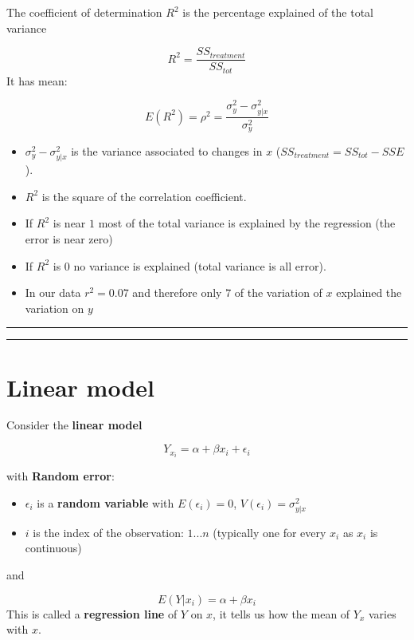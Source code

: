 \documentclass[
]{book}
\begin{document}
The coefficient of determination \(R^2\) is the percentage explained of the total variance

\[R^2=\frac{SS_{treatment}}{SS_{tot}}\]
It has mean:

\[E(R^2)=\rho^2=\frac{\sigma^2_{y}-\sigma^2_{y|x}}{\sigma^2_{y}}\]

\begin{itemize}
\item
  \(\sigma_y^2-\sigma^2_{y|x}\) is the variance associated to changes in \(x\) (\(SS_{treatment}=SS_{tot} - SSE\)).
\item
  \(R^2\) is the square of the correlation coefficient.
\item
  If \(R^2\) is near \(1\) most of the total variance is explained by the regression (the error is near zero)
\item
  If \(R^2\) is \(0\) no variance is explained (total variance is all error).
\item
  In our data \(r^2=0.07\) and therefore only \(7%
  \) of the variation of \(x\) explained the variation on \(y\)
\end{itemize}

\begin{center}\rule{0.5\linewidth}{0.5pt}\end{center}

\begin{center}\rule{0.5\linewidth}{0.5pt}\end{center}

\hypertarget{linear-model-3}{%
\section{Linear model}\label{linear-model-3}}

Consider the \textbf{linear model}

\[Y_{x_i} = \alpha + \beta x_i +\epsilon_{i}\]

with \textbf{Random error}:

\begin{itemize}
\item
  \(\epsilon_{i}\) is a \textbf{random variable} with \(E(\epsilon_{i})=0\), \(V(\epsilon_{i})=\sigma_{y|x}^2\)
\item
  \(i\) is the index of the observation: \(1...n\) (typically one for every \(x_i\) as \(x_i\) is continuous)
\end{itemize}

and

\[E(Y|x_i)=\alpha + \beta x_i\]
This is called a \textbf{regression line} of \(Y\) on \(x\), it tells us how the mean of \(Y_x\) varies with \(x\).
\end{document}
